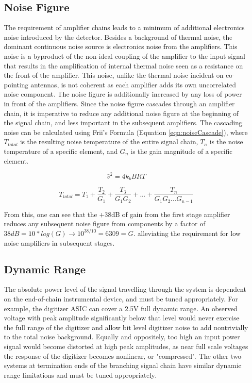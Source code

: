 	\subsection{Noise Figure} 
	The requirement of amplifier chains leads to a minimum of additional electronics noise introduced by the detector.  Besides a background of thermal noise, the dominant continuous noise source is electronics noise from the amplifiers.  This noise is a byproduct of the non-ideal coupling of the amplifier to the input signal that results in the amplification of internal thermal noise seen as a resistance on the front of the amplifier.   This noise, unlike the thermal noise incident on co-pointing antennas, is not coherent as each amplifier adds its own uncorrelated noise component.  The noise figure is additionally increased by any loss of power in front of the amplifiers.  Since the noise figure cascades through an amplifier chain, it is imperative to reduce any additional noise figure at the beginning of the signal chain, and less important in the subsequent amplifiers.  The cascading noise can be calculated using Frii's Formula (Equation \ref{eqn:noiseCascade}), where $T_{total}$ is the resulting noise temperature of the entire signal chain, $T_{n}$ is the noise temperature of a specific element, and $G_{n}$ is the gain magnitude of a specific element.
	
\begin{equation}
	\bar{v}^{2} = 4k_{b}BRT
	\label{eqn:JohnsonNyquistNoise}
\end{equation}

	
\begin{equation}
	\label{eqn:noiseCascade}
	T_{total} = T_{1} + \frac{T_{2}}{G_{1}} + \frac{T_{3}}{G_{1}G_{2}} + ... + \frac{T_{n}}{G_{1}G_{2}...G_{n-1}}
\end{equation}
	
	From this, one can see that the +38dB of gain from the first stage amplifier reduces any subsequent noise figure from components by a factor of $38dB = 10*log(G) \rightarrow 10^{38/10} =  6309 = G$. alleviating the requirement for low noise amplifiers in subsequent stages.


	\subsection{Dynamic Range}
		The absolute power level of the signal travelling through the system is dependent on the end-of-chain instrumental device, and must be tuned appropriately.  For example, the digitizer ASIC can cover a 2.5V full dynamic range.  An observed voltage with peak amplitude significantly below that level would never exercise the full range of the digitizer and allow bit level digitizer noise to add nontrivially to the total noise background.  Equally and oppositely, too high an input power signal would become distorted at high peak amplitudes, as near full scale voltages the response of the digitizer becomes nonlinear, or "compressed". The other two systems at termination ends of the branching signal chain have similar dynamic range limitations and must be tuned appropriately.
		
